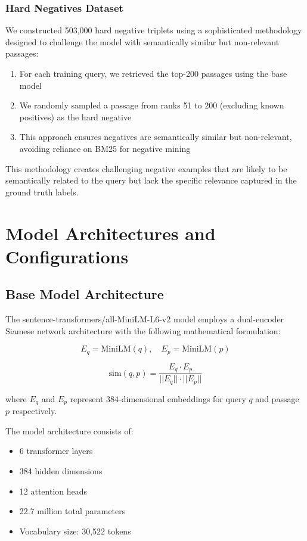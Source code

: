 \subsubsection{Hard Negatives Dataset}

We constructed 503,000 hard negative triplets using a sophisticated methodology designed to challenge the model with semantically similar but non-relevant passages:

\begin{enumerate}
\item For each training query, we retrieved the top-200 passages using the base model
\item We randomly sampled a passage from ranks 51 to 200 (excluding known positives) as the hard negative
\item This approach ensures negatives are semantically similar but non-relevant, avoiding reliance on BM25 \cite{robertson2009probabilistic} for negative mining
\end{enumerate}

This methodology creates challenging negative examples that are likely to be semantically related to the query but lack the specific relevance captured in the ground truth labels.

\section{Model Architectures and Configurations}

\subsection{Base Model Architecture}

The sentence-transformers/all-MiniLM-L6-v2 model employs a dual-encoder Siamese network architecture \cite{dong2022exploring, bromley1993signature} with the following mathematical formulation:

\begin{equation}
E_q = \text{MiniLM}(q), \quad E_p = \text{MiniLM}(p)
\end{equation}

\begin{equation}
\text{sim}(q,p) = \frac{E_q \cdot E_p}{||E_q|| \cdot ||E_p||}
\end{equation}

where $E_q$ and $E_p$ represent 384-dimensional embeddings for query $q$ and passage $p$ respectively.

The model architecture consists of:
\begin{itemize}
\item 6 transformer layers \cite{vaswani2017attention}
\item 384 hidden dimensions  
\item 12 attention heads
\item 22.7 million total parameters
\item Vocabulary size: 30,522 tokens
\end{itemize}

